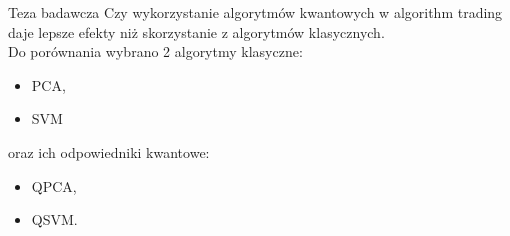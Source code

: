 \begin{frame}[fragile]{Teza badawcza}
    Czy wykorzystanie algorytmów kwantowych w algorithm trading daje lepsze efekty niż skorzystanie z algorytmów klasycznych. \\ \pause
    Do porównania wybrano 2 algorytmy klasyczne:
    \begin{itemize}
        \item PCA,
        \item SVM
    \end{itemize}
    oraz ich odpowiedniki kwantowe:
    \begin{itemize}
        \item QPCA,
        \item QSVM.
    \end{itemize}
\end{frame}
    
    